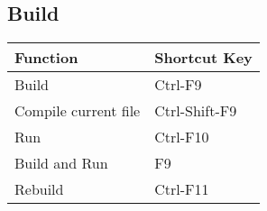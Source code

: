 \subsection{Build}

\begin{tabular}{|l|l|}\hline
Function 	&	Shortcut Key\\ \hline
Build 		&	Ctrl-F9\\ \hline
Compile current file	&	Ctrl-Shift-F9\\ \hline
Run		&	Ctrl-F10\\ \hline
Build and Run 	&	F9\\ \hline
Rebuild 	&	Ctrl-F11\\ \hline
\end{tabular}






